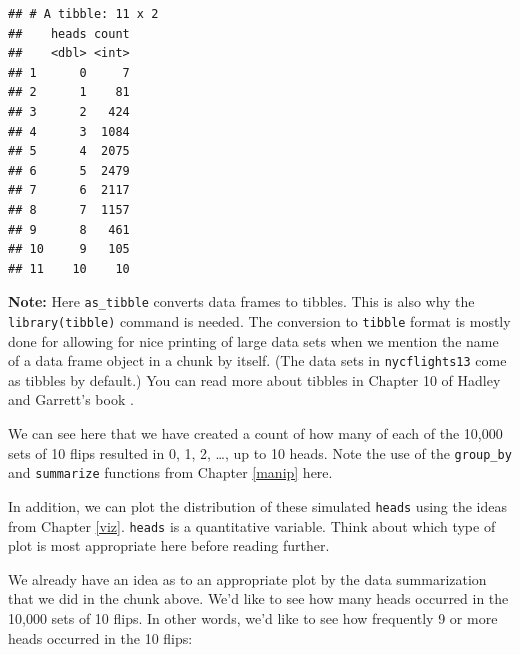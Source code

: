 \documentclass[]{tufte-book}
\newenvironment{Shaded}{\begin{snugshade}}{\end{snugshade}}
\newcommand{\KeywordTok}[1]{\textcolor[rgb]{0.13,0.29,0.53}{\textbf{{#1}}}}
\newcommand{\DataTypeTok}[1]{\textcolor[rgb]{0.13,0.29,0.53}{{#1}}}
\newcommand{\DecValTok}[1]{\textcolor[rgb]{0.00,0.00,0.81}{{#1}}}
\newcommand{\StringTok}[1]{\textcolor[rgb]{0.31,0.60,0.02}{{#1}}}
\newcommand{\NormalTok}[1]{{#1}}
\begin{document}
\begin{Shaded}
\end{Shaded}

\begin{verbatim}
## # A tibble: 11 x 2
##    heads count
##    <dbl> <int>
## 1      0     7
## 2      1    81
## 3      2   424
## 4      3  1084
## 5      4  2075
## 6      5  2479
## 7      6  2117
## 8      7  1157
## 9      8   461
## 10     9   105
## 11    10    10
\end{verbatim}

\textbf{Note:} Here \texttt{as\_tibble} converts data frames to tibbles.
This is also why the \texttt{library(tibble)} command is needed. The
conversion to \texttt{tibble} format is mostly done for allowing for
nice printing of large data sets when we mention the name of a data
frame object in a chunk by itself. (The data sets in
\texttt{nycflights13} come as tibbles by default.) You can read more
about tibbles in Chapter 10 of Hadley and Garrett's book
\citep{rds2016}.

We can see here that we have created a count of how many of each of the
10,000 sets of 10 flips resulted in 0, 1, 2, \ldots{}, up to 10 heads.
Note the use of the \texttt{group\_by} and \texttt{summarize} functions
from Chapter \ref{manip} here.

In addition, we can plot the distribution of these simulated
\texttt{heads} using the ideas from Chapter \ref{viz}. \texttt{heads} is
a quantitative variable. Think about which type of plot is most
appropriate here before reading further.

We already have an idea as to an appropriate plot by the data
summarization that we did in the chunk above. We'd like to see how many
heads occurred in the 10,000 sets of 10 flips. In other words, we'd like
to see how frequently 9 or more heads occurred in the 10 flips:
\end{document}
